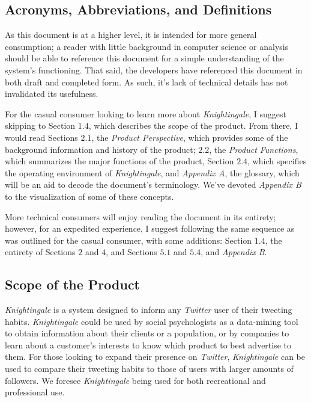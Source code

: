 \documentclass[a4paper, 12pt]{article}
\begin{document}
\subsection{Acronyms, Abbreviations, and Definitions} \label{sec:abbr}
\begin{adjustwidth}{2em}{0pt}
As this document is at a higher level, it is intended for more general consumption; a reader with little background in computer science or analysis should be able to reference this document for a simple understanding of the system’s functioning. That said, the developers have referenced this document in both draft and completed form. As such, it’s lack of technical details has not invalidated its usefulness. \newline

\noindent For the casual consumer looking to learn more about \textit{Knightingale}, I suggest skipping to Section $1.4$, which describes the scope of the product. From there, I would read Sections $2.1$, the \textit{Product Perspective}, which provides some of the background information and history of the product; $2.2$, the \textit{Product Functions}, which summarizes the major functions of the product, Section $2.4$, which specifies the operating environment of \textit{Knightingale}, and \textit{Appendix A}, the glossary, which will be an aid to decode the document’s terminology. We've devoted \textit{Appendix B} to the visualization of some of these concepts. \newline

\noindent More technical consumers will enjoy reading the document in its entirety; however, for an expedited experience, I suggest following the same sequence as was outlined for the casual consumer, with some additions: Section $1.4$, the entirety of Sections $2$ and $4$, and Sections $5.1$ and $5.4$, and \textit{Appendix B}. \newline
\end{adjustwidth}

\subsection{Scope of the Product} \label{sec:scope}
\begin{adjustwidth}{2em}{0pt}
\textit{Knightingale} is a system designed to inform any \textit{Twitter} user of their tweeting habits. \textit{Knightingale} could be used by social psychologists as a data-mining tool to obtain information about their clients or a population, or by companies to learn about a customer's interests to know which product to best advertise to them. For those looking to expand their presence on \textit{Twitter}, \textit{Knightingale} can be used to compare their tweeting habits to those of users with larger amounts of followers. We foresee \textit{Knightingale} being used for both recreational and professional use.
\end{adjustwidth}
\end{document}
